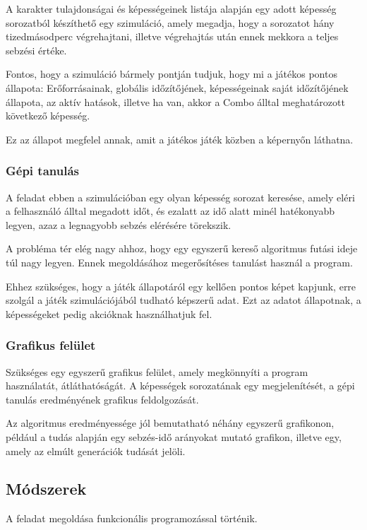 \documentclass[12pt]{article}
\begin{document}
A karakter tulajdonságai és képességeinek listája alapján egy adott képesség sorozatból készíthető egy szimuláció, amely megadja, hogy a sorozatot hány tizedmásodperc végrehajtani, illetve végrehajtás után ennek mekkora a teljes sebzési értéke.

Fontos, hogy a szimuláció bármely pontján tudjuk, hogy mi a játékos pontos állapota: Erőforrásainak, globális időzítőjének, képességeinak saját időzítőjének állapota, az aktív hatások, illetve ha van, akkor a Combo álltal meghatározott következő képesség.

Ez az állapot megfelel annak, amit a játékos játék közben a képernyőn láthatna.

\subsubsection{Gépi tanulás}

A feladat ebben a szimulációban egy olyan képesség sorozat keresése, amely eléri a felhasználó álltal megadott időt, és ezalatt az idő alatt minél hatékonyabb legyen, azaz a legnagyobb sebzés elérésére törekszik.

A probléma tér elég nagy ahhoz, hogy egy egyszerű kereső algoritmus futási ideje túl nagy legyen. Ennek megoldásához megerősítéses tanulást használ a program.

Ehhez szükséges, hogy a játék állapotáról egy kellően pontos képet kapjunk, erre szolgál a játék szimulációjából tudható képszerű adat. Ezt az adatot állapotnak, a képességeket pedig akcióknak használhatjuk fel.

\subsubsection{Grafikus felület}

Szükséges egy egyszerű grafikus felület, amely megkönnyíti a program használatát, átláthatóságát. A képességek sorozatának egy megjelenítését, a gépi tanulás eredményének grafikus feldolgozását.

Az algoritmus eredményessége jól bemutatható néhány egyszerű grafikonon, például a tudás alapján egy sebzés-idő arányokat mutató grafikon, illetve egy, amely az elmúlt generációk tudását jelöli.

\subsection{Módszerek}

A feladat megoldása funkcionális programozással történik.
\end{document}
